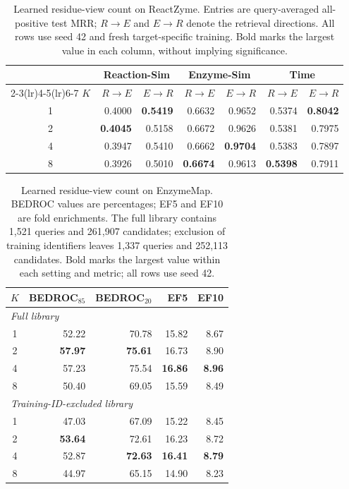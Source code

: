 \begin{table}[htbp]
\centering
\caption{Learned residue-view count on ReactZyme. Entries are query-averaged
all-positive test MRR; $R\!\to\!E$ and $E\!\to\!R$ denote the retrieval
directions. All rows use seed 42 and fresh target-specific training.
Bold marks the largest value in each column, without implying significance.}
\label{tab:v4-k-reactzyme}
\begin{tabular}{crrrrrr}
\toprule
 & \multicolumn{2}{c}{Reaction-Sim} & \multicolumn{2}{c}{Enzyme-Sim} & \multicolumn{2}{c}{Time} \\
\cmidrule(lr){2-3}\cmidrule(lr){4-5}\cmidrule(lr){6-7}
$K$ & $R\!\to\!E$ & $E\!\to\!R$ & $R\!\to\!E$ & $E\!\to\!R$ & $R\!\to\!E$ & $E\!\to\!R$ \\
\midrule
1 & 0.4000 & \textbf{0.5419} & 0.6632 & 0.9652 & 0.5374 & \textbf{0.8042} \\
2 & \textbf{0.4045} & 0.5158 & 0.6672 & 0.9626 & 0.5381 & 0.7975 \\
4 & 0.3947 & 0.5410 & 0.6662 & \textbf{0.9704} & 0.5383 & 0.7897 \\
8 & 0.3926 & 0.5010 & \textbf{0.6674} & 0.9613 & \textbf{0.5398} & 0.7911 \\
\bottomrule
\end{tabular}
\end{table}

\begin{table}[htbp]
\centering
\caption{Learned residue-view count on EnzymeMap. BEDROC values are
percentages; EF5 and EF10 are fold enrichments. The full library contains
1,521 queries and 261,907 candidates; exclusion of training identifiers
leaves 1,337 queries and 252,113 candidates. Bold marks the largest value
within each setting and metric; all rows use seed 42.}
\label{tab:v4-k-enzymemap}
\begin{tabular}{crrrr}
\toprule
$K$ & BEDROC$_{85}$ & BEDROC$_{20}$ & EF5 & EF10 \\
\midrule
\multicolumn{5}{l}{\emph{Full library}} \\
1 & 52.22 & 70.78 & 15.82 & 8.67 \\
2 & \textbf{57.97} & \textbf{75.61} & 16.73 & 8.90 \\
4 & 57.23 & 75.54 & \textbf{16.86} & \textbf{8.96} \\
8 & 50.40 & 69.05 & 15.59 & 8.49 \\
\midrule
\multicolumn{5}{l}{\emph{Training-ID-excluded library}} \\
1 & 47.03 & 67.09 & 15.22 & 8.45 \\
2 & \textbf{53.64} & 72.61 & 16.23 & 8.72 \\
4 & 52.87 & \textbf{72.63} & \textbf{16.41} & \textbf{8.79} \\
8 & 44.97 & 65.15 & 14.90 & 8.23 \\
\bottomrule
\end{tabular}
\end{table}

